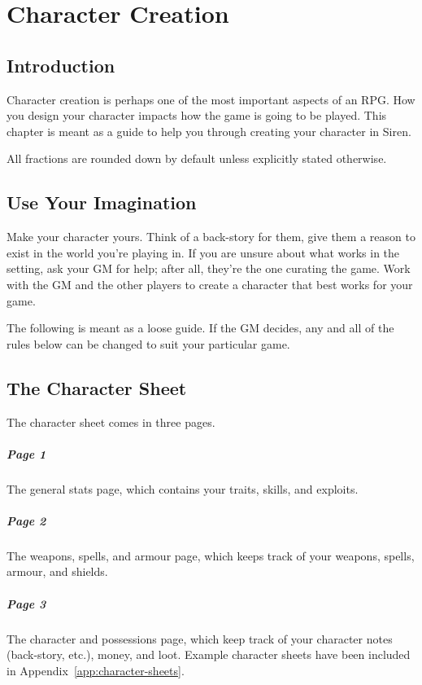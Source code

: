 \chapter{Character Creation}\label{chap:char-creat}
\section{Introduction}
Character creation is perhaps one of the most important aspects of an RPG.
How you design your character impacts how the game is going to be played.
This chapter is meant as a guide to help you through creating your character in Siren.

\note All fractions are rounded down by default unless explicitly stated otherwise.

\section{Use Your Imagination}
Make your character yours.
Think of a back-story for them, give them a reason to exist in the world you're playing in.
If you are unsure about what works in the setting, ask your GM for help; after all, they're the one curating the game.
Work with the GM and the other players to create a character that best works for your game.

\note The following is meant as a loose guide.
If the GM decides, any and all of the rules below can be changed to suit your particular game.

\section{The Character Sheet}
The character sheet comes in three pages.
\paragraph{Page 1} The general stats page, which contains your traits, skills, and exploits.
\paragraph{Page 2} The weapons, spells, and armour page, which keeps track of your weapons, spells, armour, and shields.
\paragraph{Page 3} The character and possessions page, which keep track of your character notes (back-story, etc.), money, and loot.
Example character sheets have been included in Appendix~\ref{app:character-sheets}.

